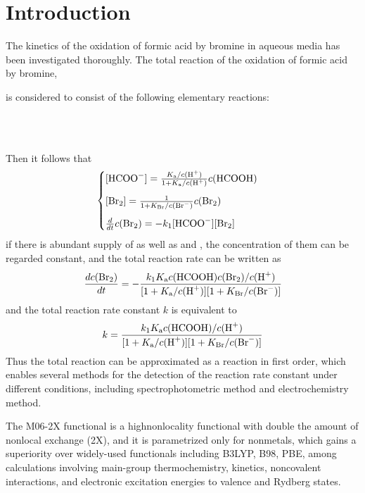 \documentclass[%
 reprint,
 amsmath,amssymb,
 aps,
10.5pt,
]{revtex4-1}
\begin{document}
\section{Introduction}
The kinetics of the oxidation of formic acid by bromine in aqueous media has been investigated thoroughly\cite{herbine1980oxidation,brusa1980kinetics}. The total reaction of the oxidation of formic acid by bromine,
\begin{center}
\end{center}
is considered to consist of the following elementary reactions:
\begin{center}
 \\
 \\
\end{center}
Then it follows that
\begin{equation}
	\begin{cases}
	[\ce{HCOO-}] = \frac{K_\text{a}/c(\ce{H+})}{1+K_\text{a}/c(\ce{H+})} c(\ce{HCOOH}) \\[0.3cm]
	[\ce{Br2}] = \frac{1}{1+K_\text{\ce{Br}}/c(\ce{Br-})} c(\ce{Br2})\\[0.3cm]
	\frac{d}{dt} c(\ce{Br2}) = - k_1 [\ce{HCOO-}] [\ce{Br2}] 
	\end{cases}
\end{equation}
if there is abundant supply of  as well as  and , the concentration of them can be regarded constant, and the total reaction rate can be written as
\begin{equation}
	\frac{d c(\ce{Br2})}{dt} = -\frac{k_1 K_\text{a}  c(\ce{HCOOH})c(\ce{Br2})/c(\ce{H+})}{[1+K_\text{a}/c(\ce{H+})][1+K_\text{\ce{Br}}/c(\ce{Br-})]}
\end{equation}
and the total reaction rate constant $k$ is equivalent to
\begin{equation}
	k=\frac{k_1 K_\text{a}  c(\ce{HCOOH})/c(\ce{H+})}{[1+K_\text{a}/c(\ce{H+})][1+K_\text{\ce{Br}}/c(\ce{Br-})]}
\end{equation}
Thus the total reaction can be approximated as a reaction in first order, which enables several methods for the detection of the reaction rate constant under different conditions, including spectrophotometric method and electrochemistry method.

The M06-2X functional is a highnonlocality functional with double the amount of nonlocal exchange (2X), and it is parametrized only for nonmetals, which gains a superiority over widely-used functionals including B3LYP, B98, PBE, among calculations involving main-group thermochemistry, kinetics, noncovalent interactions, and electronic excitation energies to valence and Rydberg states.\cite{zhao2008m06}
\end{document}
